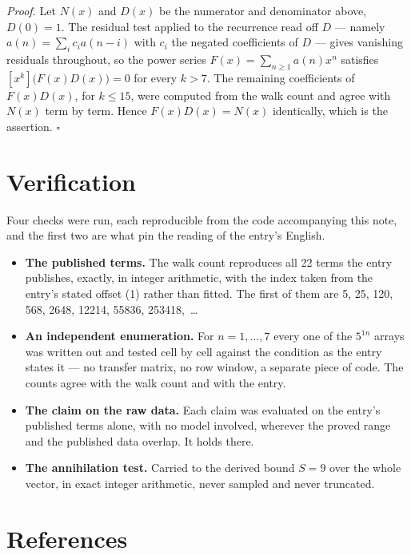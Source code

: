 \documentclass[11pt]{article}
\theoremstyle{definition}
\begin{document}
{\itshape Proof.} Let $N(x)$ and $D(x)$ be the numerator and denominator above, $D(0)=1$. The residual test applied to the recurrence read off $D$ --- namely $a(n) = \sum_i c_i a(n-i)$ with $c_i$ the negated coefficients of $D$ --- gives vanishing residuals throughout, so the power series $F(x)=\sum_{n\ge 1}a(n)x^n$ satisfies $[x^k]\bigl(F(x)D(x)\bigr) = 0$ for every $k > 7$. The remaining coefficients of $F(x)D(x)$, for $k \le 15$, were computed from the walk count and agree with $N(x)$ term by term. Hence $F(x)D(x) = N(x)$ identically, which is the assertion. $\square$

\section{Verification}

Four checks were run, each reproducible from the code accompanying this note, and the first two are what pin the reading of the entry's English.

\begin{itemize}

\item {\bfseries The published terms.} The walk count reproduces all 22 terms the entry publishes, exactly, in integer arithmetic, with the index taken from the entry's stated offset (1) rather than fitted. The first of them are 5, 25, 120, 568, 2648, 12214, 55836, 253418,~\dots

\item {\bfseries An independent enumeration.} For $n = 1,\dots,7$ every one of the $5^{1n}$ arrays was written out and tested cell by cell against the condition as the entry states it --- no transfer matrix, no row window, a separate piece of code. The counts agree with the walk count and with the entry.

\item {\bfseries The claim on the raw data.} Each claim was evaluated on the entry's published terms alone, with no model involved, wherever the proved range and the published data overlap. It holds there.

\item {\bfseries The annihilation test.} Carried to the derived bound $S = 9$ over the whole vector, in exact integer arithmetic, never sampled and never truncated.

\end{itemize}

\section{References}
\end{document}

